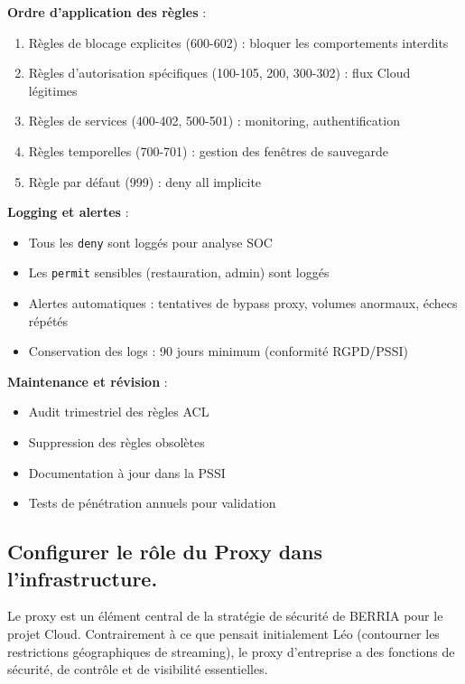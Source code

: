 \medskip

\noindent \textbf{Ordre d'application des règles} :
\begin{enumerate}
  \item Règles de blocage explicites (600-602) : bloquer les comportements interdits
  \item Règles d'autorisation spécifiques (100-105, 200, 300-302) : flux Cloud légitimes
  \item Règles de services (400-402, 500-501) : monitoring, authentification
  \item Règles temporelles (700-701) : gestion des fenêtres de sauvegarde
  \item Règle par défaut (999) : deny all implicite
\end{enumerate}

\medskip

\noindent \textbf{Logging et alertes} :
\begin{itemize}
  \item Tous les \texttt{deny} sont loggés pour analyse SOC
  \item Les \texttt{permit} sensibles (restauration, admin) sont loggés
  \item Alertes automatiques : tentatives de bypass proxy, volumes anormaux, échecs répétés
  \item Conservation des logs : 90 jours minimum (conformité RGPD/PSSI)
\end{itemize}

\medskip

\noindent \textbf{Maintenance et révision} :
\begin{itemize}
  \item Audit trimestriel des règles ACL
  \item Suppression des règles obsolètes
  \item Documentation à jour dans la PSSI
  \item Tests de pénétration annuels pour validation
\end{itemize}

\newpage

\subsection*{Configurer le rôle du Proxy dans l'infrastructure.}
{}

Le proxy est un élément central de la stratégie de sécurité de BERRIA pour le projet Cloud. Contrairement à ce que pensait initialement Léo (contourner les restrictions géographiques de streaming), le proxy d'entreprise a des fonctions de sécurité, de contrôle et de visibilité essentielles.

